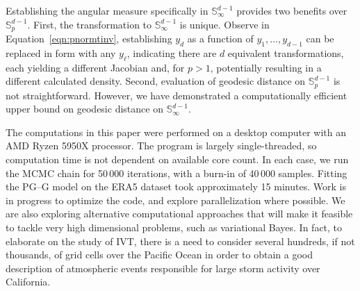 Establishing the angular measure
    specifically in $\mathbb{S}_{\infty}^{d-1}$ provides two benefits over 
    $\mathbb{S}_p^{d-1}$.  First, the transformation to 
    $\mathbb{S}_{\infty}^{d-1}$ is unique.  Observe in 
    Equation~\eqref{eqn:pnormtinv}, establishing $y_d$ as a function
    of $y_1,\ldots,y_{d-1}$ can be replaced in form with any $y_{\ell}$, 
    indicating there are $d$ equivalent transformations, each yielding a different
    Jacobian and, for $p>1$, potentially resulting in a different calculated density.  
    Second, evaluation of geodesic distance on $\mathbb{S}_p^{d-1}$ is not 
    straightforward.  However, we have demonstrated a computationally efficient 
    upper bound on geodesic distance on $\mathbb{S}_{\infty}^{d-1}$.
 

The computations in this paper were performed on a desktop computer with an 
    AMD Ryzen 5950X processor. The program is largely single-threaded, so 
    computation time is not dependent on available core count.  In each case, 
    we run the MCMC chain for 50\,000 iterations, with a burn-in of 40\,000 
    samples.  Fitting the PG--G model on the ERA5 dataset took approximately 
    15 minutes.  Work is in progress to optimize the code, and explore 
    parallelization where possible.  We are also exploring alternative 
    computational approaches that will make it feasible to tackle very high 
    dimensional problems, such as variational Bayes. In fact, to elaborate on 
    the study of IVT, there is a need to consider several hundreds, if not thousands, 
    of grid cells over the Pacific Ocean in order to obtain a good description of 
    atmospheric events responsible for large storm activity over California.  

